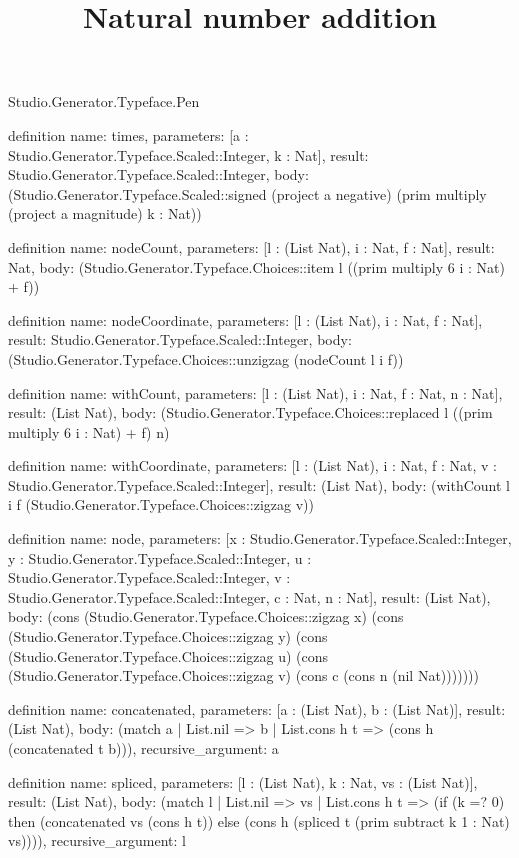 \begin{lexlean}{Studio.Generator.Typeface.Pen}
\title{Natural number addition}
\begin{semanticmodule}
definition{
  name: times,
  parameters: [a : Studio.Generator.Typeface.Scaled::Integer, k : Nat],
  result: Studio.Generator.Typeface.Scaled::Integer,
  body: (Studio.Generator.Typeface.Scaled::signed (project a negative) (prim multiply (project a magnitude) k : Nat))
}

definition{
  name: nodeCount,
  parameters: [l : (List Nat), i : Nat, f : Nat],
  result: Nat,
  body: (Studio.Generator.Typeface.Choices::item l ((prim multiply 6 i : Nat) + f))
}

definition{
  name: nodeCoordinate,
  parameters: [l : (List Nat), i : Nat, f : Nat],
  result: Studio.Generator.Typeface.Scaled::Integer,
  body: (Studio.Generator.Typeface.Choices::unzigzag (nodeCount l i f))
}

definition{
  name: withCount,
  parameters: [l : (List Nat), i : Nat, f : Nat, n : Nat],
  result: (List Nat),
  body: (Studio.Generator.Typeface.Choices::replaced l ((prim multiply 6 i : Nat) + f) n)
}

definition{
  name: withCoordinate,
  parameters: [l : (List Nat), i : Nat, f : Nat, v : Studio.Generator.Typeface.Scaled::Integer],
  result: (List Nat),
  body: (withCount l i f (Studio.Generator.Typeface.Choices::zigzag v))
}

definition{
  name: node,
  parameters: [x : Studio.Generator.Typeface.Scaled::Integer, y : Studio.Generator.Typeface.Scaled::Integer, u : Studio.Generator.Typeface.Scaled::Integer, v : Studio.Generator.Typeface.Scaled::Integer, c : Nat, n : Nat],
  result: (List Nat),
  body: (cons (Studio.Generator.Typeface.Choices::zigzag x) (cons (Studio.Generator.Typeface.Choices::zigzag y) (cons (Studio.Generator.Typeface.Choices::zigzag u) (cons (Studio.Generator.Typeface.Choices::zigzag v) (cons c (cons n (nil Nat)))))))
}

definition{
  name: concatenated,
  parameters: [a : (List Nat), b : (List Nat)],
  result: (List Nat),
  body: (match a
    | List.nil => b
    | List.cons h t => (cons h (concatenated t b))),
  recursive_argument: a
}

definition{
  name: spliced,
  parameters: [l : (List Nat), k : Nat, vs : (List Nat)],
  result: (List Nat),
  body: (match l
    | List.nil => vs
    | List.cons h t => (if (k =? 0) then (concatenated vs (cons h t)) else (cons h (spliced t (prim subtract k 1 : Nat) vs)))),
  recursive_argument: l
}


\end{semanticmodule}
\end{lexlean}
